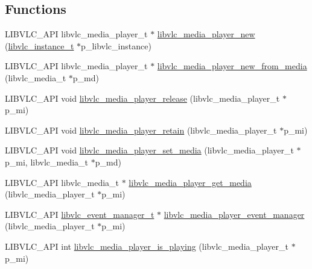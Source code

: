 \subsection*{Functions}
\begin{DoxyCompactItemize}
\item 
L\+I\+B\+V\+L\+C\+\_\+\+A\+PI libvlc\+\_\+media\+\_\+player\+\_\+t $\ast$ \hyperlink{group__libvlc__media__player_ga210a0f60ad0a2a7ac0460269b5ac2b34}{libvlc\+\_\+media\+\_\+player\+\_\+new} (\hyperlink{group__libvlc__core_ga316d739a80da4678206c79f4d6c2e284}{libvlc\+\_\+instance\+\_\+t} $\ast$p\+\_\+libvlc\+\_\+instance)
\item 
L\+I\+B\+V\+L\+C\+\_\+\+A\+PI libvlc\+\_\+media\+\_\+player\+\_\+t $\ast$ \hyperlink{group__libvlc__media__player_gaf6897a4ef07c684555fc600c7a63a8c4}{libvlc\+\_\+media\+\_\+player\+\_\+new\+\_\+from\+\_\+media} (libvlc\+\_\+media\+\_\+t $\ast$p\+\_\+md)
\item 
L\+I\+B\+V\+L\+C\+\_\+\+A\+PI void \hyperlink{group__libvlc__media__player_gac8d8236f3dfa549d3637100ae6d07e72}{libvlc\+\_\+media\+\_\+player\+\_\+release} (libvlc\+\_\+media\+\_\+player\+\_\+t $\ast$p\+\_\+mi)
\item 
L\+I\+B\+V\+L\+C\+\_\+\+A\+PI void \hyperlink{group__libvlc__media__player_gac05d1395d425db194eda5a29a03c346a}{libvlc\+\_\+media\+\_\+player\+\_\+retain} (libvlc\+\_\+media\+\_\+player\+\_\+t $\ast$p\+\_\+mi)
\item 
L\+I\+B\+V\+L\+C\+\_\+\+A\+PI void \hyperlink{group__libvlc__media__player_gadeb7ac440f41dbb2aa1a7811904099b1}{libvlc\+\_\+media\+\_\+player\+\_\+set\+\_\+media} (libvlc\+\_\+media\+\_\+player\+\_\+t $\ast$p\+\_\+mi, libvlc\+\_\+media\+\_\+t $\ast$p\+\_\+md)
\item 
L\+I\+B\+V\+L\+C\+\_\+\+A\+PI libvlc\+\_\+media\+\_\+t $\ast$ \hyperlink{group__libvlc__media__player_gacd3e2cbc0303a8ba8bdcb891da10876c}{libvlc\+\_\+media\+\_\+player\+\_\+get\+\_\+media} (libvlc\+\_\+media\+\_\+player\+\_\+t $\ast$p\+\_\+mi)
\item 
L\+I\+B\+V\+L\+C\+\_\+\+A\+PI \hyperlink{group__libvlc__event_gaa82f247503d3558b9117550e8d3c9259}{libvlc\+\_\+event\+\_\+manager\+\_\+t} $\ast$ \hyperlink{group__libvlc__media__player_ga123b91853ed24304d2e33f082b38948e}{libvlc\+\_\+media\+\_\+player\+\_\+event\+\_\+manager} (libvlc\+\_\+media\+\_\+player\+\_\+t $\ast$p\+\_\+mi)
\item 
L\+I\+B\+V\+L\+C\+\_\+\+A\+PI int \hyperlink{group__libvlc__media__player_ga70fd26f9bbca7eda021a49680e7fbc1c}{libvlc\+\_\+media\+\_\+player\+\_\+is\+\_\+playing} (libvlc\+\_\+media\+\_\+player\+\_\+t $\ast$p\+\_\+mi)

\end{DoxyCompactItemize}
